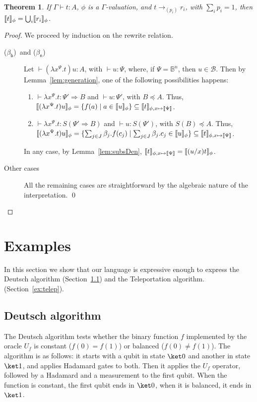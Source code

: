 \documentclass[preprint]{elsarticle}
\newtheorem{theorem}{Theorem}[section]
\newcommand\lra[1][1]{\longrightarrow_{\left(#1\right)}}
\newcommand\B{\ensuremath{\mathbb B}}
\newcommand\gB{\ensuremath{\Psi}}
\newcommand\basis{\ensuremath{\mathcal B}}
\newcommand\s[1]{\ensuremath{\mathsf{#1}}}
\newcommand\rbetab{(\s{\beta_b})}
\newcommand\rbetan{(\s{\beta_n})}
\begin{document}
\begin{theorem}\label{thm:denRed}
  If $\Gamma\vdash t:A$, $\phi$ is a $\Gamma$-valuation, and $t\lra[p_i] r_i$,
  with $\sum_ip_i=1$, then $\llbracket t \rrbracket_\phi=\bigcup_i\llbracket r_i \rrbracket_\phi$.
\end{theorem}
\begin{proof}
  We proceed by induction on the rewrite relation.
  \begin{description}
  \item[\rbetab\ and \rbetan] Let $\vdash(\lambda x^{\gB}.t)u:A$, with $\vdash
    u:\gB$, where, if $\gB=\B^n$, then $u\in\basis$. Then by
    Lemma~\ref{lem:generation}, one of the following possibilities happens:
    \begin{enumerate}
    \item $\vdash\lambda x^{\gB}.t:\gB'\Rightarrow B$ and $\vdash u:\gB'$, with
      $B\preceq A$. Thus, $\den{(\lambda x^{\gB}.t)u}_\phi=\{f(a)\mid
      a\in\den u_\phi\}\subseteq\den t_{\phi,x\mapsto\den{\gB}} $.
    \item $\vdash\lambda x^{\gB}.t:S(\gB'\Rightarrow B)$ and $\vdash u:S(\gB')$,
      with $S(B)\preceq A$. Thus, $\den{(\lambda x^{\gB}.t)u}_\phi=\{\sum_{j\in
        J}\beta_j . f(c_j)\mid \sum_{j\in J}\beta_j .
      c_j\in\den{u}_\phi\}\subseteq\den t_{\phi,x\mapsto\den{\gB}}$.
    \end{enumerate}
    In any case, by Lemma~\ref{lem:subsDen}, $\den
    t_{\phi,x\mapsto\den{\gB}}=\den{(u/x)t}_\phi$.
  \item[Other cases] All the remaining cases are straightforward by the
    algebraic nature of the interpretation.
    \qed
  \end{description}
\end{proof}

\section{Examples}\label{sec:examples}
In this section we show that our language is expressive enough to express the
Deutsch algorithm (Section~\ref{ex:deut}) and the Teleportation algorithm.
(Section~\ref{ex:telep}).

\subsection{Deutsch algorithm}\label{ex:deut}
The Deutsch algorithm tests whether the binary function $f$ implemented by the
oracle $U_f$ is constant ($f(0)=f(1)$) or balanced ($f(0)\neq f(1)$). The
algorithm is as follows: it starts with a qubit in state $\ket 0$ and another in
state $\ket 1$, and applies Hadamard gates to both. Then it applies the $U_f$
operator, followed by a Hadamard and a measurement to the first qubit. When the
function is constant, the first qubit ends in $\ket 0$, when it is balanced, it
ends in $\ket 1$.
\end{document}
